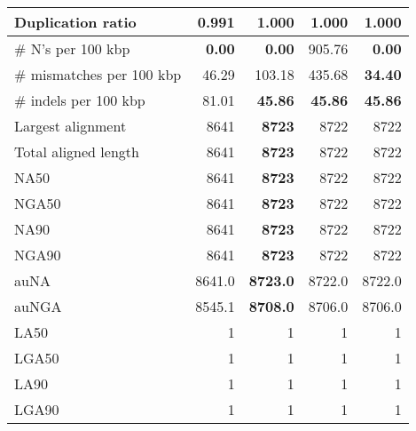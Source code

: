 \documentclass[12pt,a4paper]{article}
\begin{document}
\begin{table}[ht]
\begin{center}
\begin{tabular}{|l*{4}{|r}|}
Duplication ratio & {\bf 0.991} & 1.000 & 1.000 & 1.000 \\ \hline
\# N's per 100 kbp & {\bf 0.00} & {\bf 0.00} & 905.76 & {\bf 0.00} \\ \hline
\# mismatches per 100 kbp & 46.29 & 103.18 & 435.68 & {\bf 34.40} \\ \hline
\# indels per 100 kbp & 81.01 & {\bf 45.86} & {\bf 45.86} & {\bf 45.86} \\ \hline
Largest alignment & 8641 & {\bf 8723} & 8722 & 8722 \\ \hline
Total aligned length & 8641 & {\bf 8723} & 8722 & 8722 \\ \hline
NA50 & 8641 & {\bf 8723} & 8722 & 8722 \\ \hline
NGA50 & 8641 & {\bf 8723} & 8722 & 8722 \\ \hline
NA90 & 8641 & {\bf 8723} & 8722 & 8722 \\ \hline
NGA90 & 8641 & {\bf 8723} & 8722 & 8722 \\ \hline
auNA & 8641.0 & {\bf 8723.0} & 8722.0 & 8722.0 \\ \hline
auNGA & 8545.1 & {\bf 8708.0} & 8706.0 & 8706.0 \\ \hline
LA50 & 1 & 1 & 1 & 1 \\ \hline
LGA50 & 1 & 1 & 1 & 1 \\ \hline
LA90 & 1 & 1 & 1 & 1 \\ \hline
LGA90 & 1 & 1 & 1 & 1 \\ \hline
\end{tabular}
\end{center}
\end{table}
\end{document}
